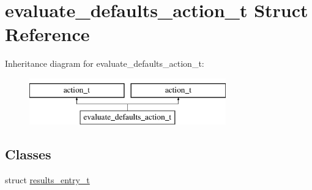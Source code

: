 \hypertarget{structevaluate__defaults__action__t}{}\section{evaluate\+\_\+defaults\+\_\+action\+\_\+t Struct Reference}
\label{structevaluate__defaults__action__t}
Inheritance diagram for evaluate\+\_\+defaults\+\_\+action\+\_\+t\+:\begin{figure}[H]
\begin{center}
\leavevmode
\includegraphics[height=2.000000cm]{structevaluate__defaults__action__t}
\end{center}
\end{figure}
\subsection*{Classes}
\begin{DoxyCompactItemize}
\item 
struct \hyperlink{structevaluate__defaults__action__t_1_1results__entry__t}{results\+\_\+entry\+\_\+t}
\end{DoxyCompactItemize}
